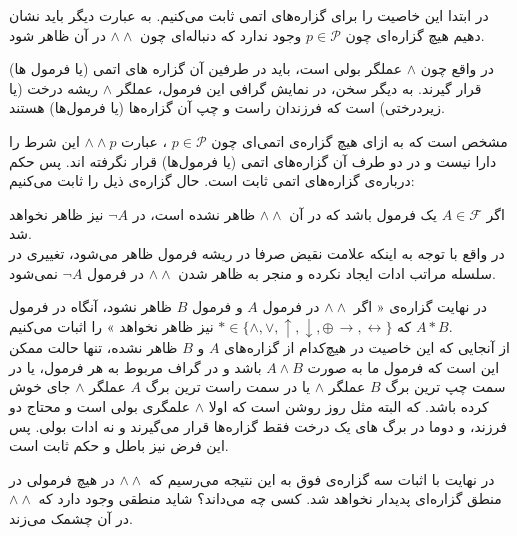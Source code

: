 \documentclass[]{exam}
\begin{document}
در ابتدا این خاصیت را برای گزاره‌های اتمی ثابت می‌کنیم.
به عبارت دیگر باید نشان دهیم هیچ گزاره‌ای چون
$p \in \mathscr{P}$
وجود ندارد که دنباله‌ای چون
$\land \land$
در آن ظاهر شود.

در واقع چون
$\land$
عملگر بولی است، باید در طرفین آن گزاره های اتمی
(یا فرمول ها)
قرار گیرند. به دیگر سخن، در نمایش گرافی این فرمول، عملگر
$\land$
ریشه درخت 
(یا زیردرختی)
است که فرزندان راست و چپ آن گزاره‌ها
(یا فرمول‌ها)
هستند.

مشخص است که به ازای هیچ گزاره‌ی اتمی‌ای چون
$p \in \mathscr{P}$
، 
عبارت
$\land \land p$
این شرط را دارا نیست و 
در دو طرف آن گزاره‌‌های اتمی
(یا فرمول‌ها)
قرار نگرفته اند. پس حکم درباره‌ی گزاره‌های اتمی ثابت است.
حال گزاره‌ی ذیل را ثابت می‌کنیم:

اگر
$A \in \mathscr{F}$
یک فرمول باشد که در آن
$\land \land$
ظاهر نشده است، 
در
$\neg A$
نیز ظاهر نخواهد شد.\\
در واقع با توجه به اینکه علامت نقیض صرفا در ریشه فرمول ظاهر می‌شود، تغییری در سلسله مراتب 
ادات ایجاد نکرده و منجر به ظاهر شدن
$\land \land$
در فرمول 
$\neg A$
نمی‌شود.

در نهایت گزاره‌‌ی
«
اگر
$\land \land$
در فرمول
$A$
و فرمول
$B$
ظاهر نشود، آنگاه در فرمول
$A * B$
که
$* \in \{\land, \lor, \uparrow, \downarrow, \oplus\, \rightarrow, \leftrightarrow \}$
نیز ظاهر نخواهد
»
را اثبات می‌کنیم.
\\
از آنجایی که این خاصیت در هیچ‌کدام از گزاره‌های 
$A$
و
$B$
ظاهر نشده، تنها حالت ممکن این است که فرمول ما به صورت 
$A \land B$
باشد و 
در گراف مربوط به هر فرمول، یا در سمت چپ ترین برگ
$B$
عملگر
$\land$
یا در سمت راست ترین برگ
$A$
عملگر 
$\land$
جای خوش کرده باشد.
که البته مثل روز روشن است که 
اولا 
$\land$
علمگری بولی است و محتاج دو فرزند،
و دوما در برگ های یک درخت فقط گزاره‌ها قرار می‌گیرند و نه ادات بولی. پس این فرض نیز باطل و حکم ثابت است.

در نهایت با اثبات سه گزاره‌ی فوق به این نتیجه می‌رسیم که 
$\land \land$
در هیچ فرمولی در منطق گزاره‌ای پدیدار نخواهد شد.
کسی چه می‌داند؟ شاید منطقی وجود دارد که
$\land \land$
در آن چشمک می‌زند. 
\end{document}
